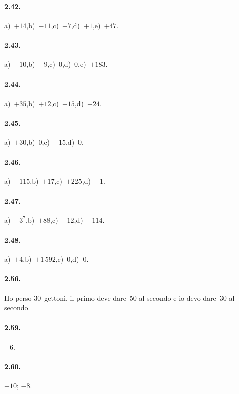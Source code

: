 \paragraph{2.42.}
a)~$+14$,\quad b)~$-11$,\quad c)~$-7$,\quad d)~$+1$,\quad e)~$+47$.

\paragraph{2.43.}
a)~$-10$,\quad b)~$-9$,\quad c)~$0$,\quad d)~$0$,\quad e)~$+183$.

\paragraph{2.44.}
a)~$+35$,\quad b)~$+12$,\quad c)~$-15$,\quad d)~$-24$.

\paragraph{2.45.}
a)~$+30$,\quad b)~$0$,\quad c)~$+15$,\quad d)~$0$.

\paragraph{2.46.}
a)~$-115$,\quad b)~$+17$,\quad c)~$+225$,\quad d)~$-1$.

\paragraph{2.47.}
a)~$-3^7$,\quad b)~$+88$,\quad c)~$-12$,\quad d)~$-114$.

\paragraph{2.48.}
a)~$+4$,\quad b)~$+1\,592$,\quad c)~$0$,\quad d)~$0$.

\paragraph{2.56.}
Ho perso 30~gettoni, il primo deve dare~50 al secondo e io devo dare~30 al secondo.

\paragraph{2.59.}
$-6$\textdegree.

\paragraph{2.60.}
$-10$; $-8$.
